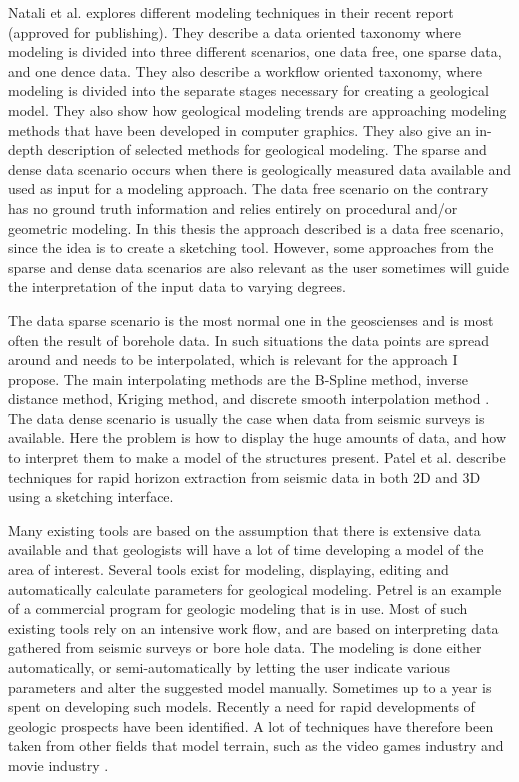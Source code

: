 \documentclass[a4paper,12pt]{report}
\begin{document}
Natali et al. explores different modeling techniques in their recent report \cite{natali2013modeling} (approved for publishing). They describe a data oriented taxonomy where modeling is divided into three different scenarios, one data free, one sparse data, and one dence data. They also describe a workflow oriented taxonomy, where modeling is divided into the separate stages necessary for creating a geological model. They also show how geological modeling trends are approaching modeling methods that have been developed in computer graphics. They also give an in-depth description of selected methods for geological modeling. The sparse and dense data scenario occurs when there is geologically measured data available and used as input for a modeling approach. The data free scenario on the contrary has no ground truth information and relies entirely on procedural and/or geometric modeling. In this thesis the approach described is a data free scenario, since the idea is to create a sketching tool. However, some approaches from the sparse and dense data scenarios are also relevant as the user sometimes will guide the interpretation of the input data to varying degrees. 

The data sparse scenario is the most normal one in the geoscienses and is most often the result of borehole data. In such situations the data points are spread around and needs to be interpolated, which is relevant for the approach I propose. The main interpolating methods are the B-Spline method, inverse distance method, Kriging method, and discrete smooth interpolation method \cite{mallet1992discrete, mallet1997discrete}. The data dense scenario is usually the case when data from seismic surveys is available. Here the problem is how to display the huge amounts of data, and how to interpret them to make a model of the structures present. Patel et al. describe techniques for rapid horizon extraction from seismic data in both 2D \cite{patel2008seismic} and 3D \cite{patel2010seismic} using a sketching interface.

Many existing tools are based on the assumption that there is extensive data available and that geologists will have a lot of time developing a model of the area of interest. Several tools exist for modeling, displaying, editing and automatically calculate parameters for geological modeling.  Petrel \cite{petrel} is an example of a commercial program for geologic modeling that is in use. Most of such existing tools rely on an intensive work flow, and are based on interpreting data gathered from seismic surveys or bore hole data. The modeling is done either automatically, or semi-automatically by letting the user indicate various parameters and alter the suggested model manually. Sometimes up to a year is spent on developing such models. Recently a need for rapid developments of geologic prospects have been identified. A lot of techniques have therefore been taken from other fields that model terrain, such as the video games industry and movie industry \cite{natali2013modeling}.
\end{document}
